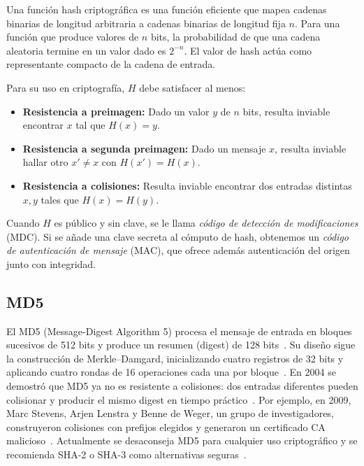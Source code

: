 Una función hash criptográfica es una función eficiente que mapea cadenas binarias de longitud arbitraria a cadenas binarias de longitud fija \(n\). Para una función que produce valores de \(n\) bits, la probabilidad de que una cadena aleatoria termine en un valor dado es \(2^{-n}\). El valor de hash actúa como representante compacto de la cadena de entrada.

Para su uso en criptografía, \(H\) debe satisfacer al menos:

\begin{itemize}
  \item \textbf{Resistencia a preimagen:} Dado un valor \(y\) de \(n\) bits, resulta inviable encontrar \(x\) tal que \(H(x)=y\).
  \item \textbf{Resistencia a segunda preimagen:} Dado un mensaje \(x\), resulta inviable hallar otro \(x'\neq x\) con \(H(x')=H(x)\).
  \item \textbf{Resistencia a colisiones:} Resulta inviable encontrar dos entradas distintas \(x,y\) tales que \(H(x)=H(y)\).
\end{itemize}

Cuando \(H\) es público y sin clave, se le llama \emph{código de detección de modificaciones} (MDC). Si se añade una clave secreta al cómputo de hash, obtenemos un \emph{código de autenticación de mensaje} (MAC), que ofrece además autenticación del origen junto con integridad.

\subsection{MD5}
El MD5 (Message-Digest Algorithm 5) procesa el mensaje de entrada en bloques sucesivos de 512 bits y produce un resumen (digest) de 128 bits~\citep{IETF1321}.  
Su diseño sigue la construcción de Merkle–Damgard, inicializando cuatro registros de 32 bits y aplicando cuatro rondas de 16 operaciones cada una por bloque~\citep{Wang04_MD5}.  
En 2004 se demostró que MD5 ya no es resistente a colisiones: dos entradas diferentes pueden colisionar y producir el mismo digest en tiempo práctico~\citep{Wang04_MD5}.  
Por ejemplo, en 2009, Marc Stevens, Arjen Lenstra y Benne de Weger, un grupo de investigadores, construyeron colisiones con prefijos elegidos y generaron un certificado CA malicioso~\citep{Stevens09_MD5_CA}.  
Actualmente se desaconseja MD5 para cualquier uso criptográfico y se recomienda SHA-2 o SHA-3 como alternativas seguras~\citep{NIST_SP800131A}.



